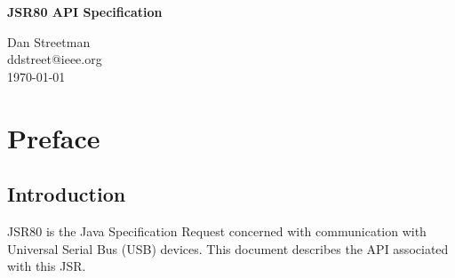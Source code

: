 \documentclass{article}
\newcommand{\mytitle}[0]{JSR80 API Specification}
\newcommand{\myauthor}[0]{Dan Streetman}
\newcommand{\mydate}[0]{\today}
\newcommand{\mysectionend}[0]{\vfill\pagebreak[1]}
\begin{document}
\pagestyle{empty}


%

\begin{titlepage}

\begin{center}
\Huge{\textbf{\mytitle}}
\end{center}

\vfill
\vfill

\begin{flushright}
\large{\myauthor}
\\
\large{ddstreet@ieee.org}
\\
\large{\mydate}
\end{flushright}

\vfill

\end{titlepage}

%

\pagestyle{fancy}
\fancyhf{}
\renewcommand{\sectionmark}[1]{\markright{\emph{\mytitle}}}
\renewcommand{\subsectionmark}[1]{\markright{\emph{\mytitle}}}
\renewcommand{\subsubsectionmark}[1]{\markright{\emph{\mytitle}}}
\fancyhead[L,RO]{\bfseries\thepage}
\fancyhead[LO]{\rightmark}

%

\tableofcontents

\listoftables

\listoffigures

\pagebreak

%

\section{Preface}

\subsection{Introduction}

JSR80 is the Java Specification Request concerned with communication with
Universal Serial Bus (USB) devices.  This document describes the API associated
with this JSR.  

\mysectionend

\end{document}
